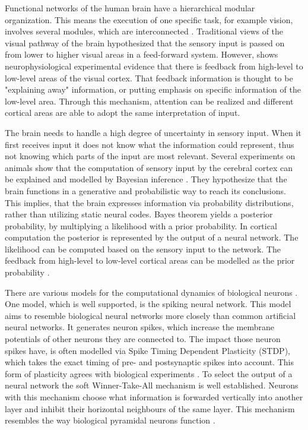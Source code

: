 Functional networks of the human brain have a hierarchical modular organization. This means the execution of one specific task, for example vision, involves several modules, which are interconnected  \citep{hierarchicalBrain}. Traditional views of the visual pathway of the brain hypothesized that the sensory input is passed on from lower to higher visual areas in a feed-forward system. However, \citet{HierachicalBayesVisualCortex} shows  neurophysiological experimental evidence that there is feedback from high-level to low-level areas of the visual cortex. That feedback information is thought to be "explaining away" information, or putting emphasis on specific information of the low-level area. Through this mechanism, attention can be realized and different cortical areas are able to adopt the same interpretation of  input.
 
The brain needs to handle a high degree of uncertainty in sensory input. When it first receives input it does not know what the information could represent, thus not knowing which parts of the input are most relevant. Several experiments on animals show that the computation of sensory input by the cerebral cortex can be explained and modelled by Bayesian inference \citep{neuralSubstrate, HierachicalBayesVisualCortex, anatomyOfInference}. They hypothesize that the brain functions in a generative and probabilistic way to reach its conclusions. This implies, that the brain expresses information via probability distributions, rather than utilizing static neural codes. 
Bayes theorem yields a posterior probability, by multiplying a likelihood with a prior probability. In cortical computation the posterior is  represented by the output of a neural network. The likelihood can be computed based on the sensory input to the network. The feedback from high-level to low-level cortical areas can be modelled as the prior probability \citep{nessler}.

There are various models for the computational dynamics of biological neurons \citep{SpikingNeuronModelsBook}. One model, which is well supported, is the spiking neural network. This model aims to resemble biological neural networks more closely than common artificial neural networks. It generates neuron spikes, which increase the membrane potentials of other neurons they are connected to. The impact those neuron spikes have, is often modelled via Spike Timing Dependent Plasticity (STDP), which takes the exact timing of pre- and postsynaptic spikes into account. This form of plasticity agrees with biological experiments \citep{STDPFELDMAN, STDPDAN}. To select the output of a neural network the soft Winner-Take-All mechanism is well established. Neurons with this mechanism choose what information is forwarded vertically into another layer and inhibit their horizontal neighbours of the same layer. This mechanism resembles the way biological pyramidal neurons function \citep{softWTA}.

